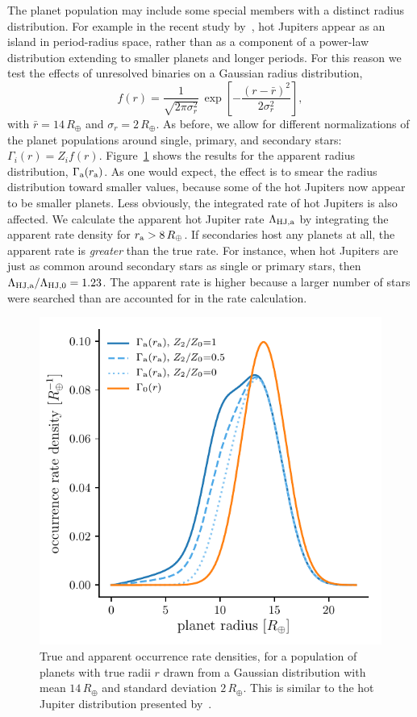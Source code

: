 \documentclass[12pt,modern]{aastex61}
\renewcommand{\a}{_{\rm a}}
\begin{document}
The planet population may include some special members with a distinct
radius distribution.  For example in the recent study
by~\citet{petigura_CKS_2017}, hot Jupiters appear as an island in
period-radius space, rather than as a component of a power-law
distribution extending to smaller planets and longer periods.  For
this reason we test the effects of unresolved binaries on a Gaussian
radius distribution,
\begin{equation}
    f(r) = 
    \frac{1}{\sqrt{2 \pi \sigma_r^2}} \,
    \exp \left[ -\frac{(r-\bar{r})^2}{2\sigma_r^2} \right],
\end{equation}
with $\bar{r} = 14\,R_\oplus$ and $\sigma_r = 2\,R_\oplus$.  As before,
we allow for different normalizations of the planet populations around
single, primary, and secondary stars: $\Gamma_i(r) = Z_i f(r)$.
Figure~\ref{fig:gaussian_HJ} shows the results for the apparent radius
distribution, $\Gamma\a(r\a)$.  As one would expect, the effect is to
smear the radius distribution toward smaller values, because some of
the hot Jupiters now appear to be smaller planets.  Less obviously,
the integrated rate of hot Jupiters is also affected.  We calculate
the apparent hot Jupiter rate $\Lambda_{\rm HJ,a}$ by integrating the
apparent rate density for $r\a > 8\,R_\oplus$.  If secondaries host
any planets at all, the apparent rate is {\it greater} than the true
rate.  For instance, when hot Jupiters are just as common around
secondary stars as single or primary stars, then $\Lambda_{\rm
HJ,a}/\Lambda_{{\rm HJ},0} = 1.23$.
The apparent rate is higher because a larger number of stars were
searched than are accounted for in the rate calculation.

\begin{figure}[!tb]
    \centering
    \includegraphics[width=.6\textwidth]{figures/f7.pdf}
    \caption{ True and apparent occurrence rate densities, for a
    population of planets with true radii $r$ drawn from a Gaussian
    distribution with mean $14\,R_\oplus$ and standard deviation
    $2\,R_\oplus$.  This is similar to the hot Jupiter distribution
    presented by~\citet{petigura_CKS_2017}.  }
    \label{fig:gaussian_HJ}
\end{figure}
\end{document}
